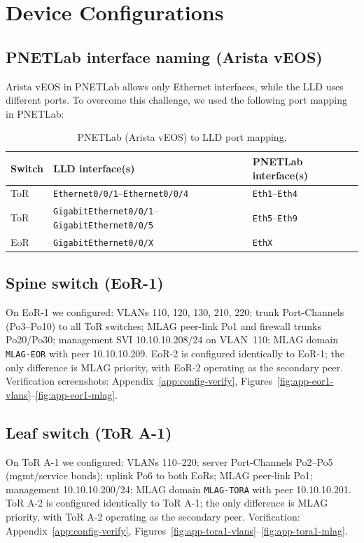 \section{Device Configurations}

\subsection{PNETLab interface naming (Arista vEOS)}
Arista vEOS in PNETLab allows only Ethernet interfaces, while the LLD uses different ports. To overcome this challenge, we used the following port mapping in PNETLab:

\begin{table}[htbp]
    \centering
    \small
    \caption{PNETLab (Arista vEOS) to LLD port mapping.}
    \label{tab:pnetlab-port-map}
    \begin{tabular}{|l|l|l|}
        \hline
        \textbf{Switch} & \textbf{LLD interface(s)} & \textbf{PNETLab interface(s)} \\
        \hline
        ToR & \texttt{Ethernet0/0/1}--\texttt{Ethernet0/0/4} & \texttt{Eth1}--\texttt{Eth4} \\
        ToR & \texttt{GigabitEthernet0/0/1}--\texttt{GigabitEthernet0/0/5} & \texttt{Eth5}--\texttt{Eth9} \\
        EoR & \texttt{GigabitEthernet0/0/X} & \texttt{EthX} \\
        \hline
    \end{tabular}
\end{table}

\subsection{Spine switch (EoR-1)}
On EoR-1 we configured: VLANs 110, 120, 130, 210, 220; trunk Port-Channels (Po3--Po10) to all ToR switches; MLAG peer-link Po1 and firewall trunks Po20/Po30; management SVI 10.10.10.208/24 on VLAN~110; MLAG domain \texttt{MLAG-EOR} with peer 10.10.10.209. EoR-2 is configured identically to EoR-1; the only difference is MLAG priority, with EoR-2 operating as the secondary peer. Verification screenshots: Appendix~\ref{app:config-verify}, Figures~\ref{fig:app-eor1-vlans}--\ref{fig:app-eor1-mlag}.

\subsection{Leaf switch (ToR A-1)}
On ToR A-1 we configured: VLANs 110--220; server Port-Channels Po2--Po5 (mgmt/service bonds); uplink Po6 to both EoRs; MLAG peer-link Po1; management 10.10.10.200/24; MLAG domain \texttt{MLAG-TORA} with peer 10.10.10.201. ToR A-2 is configured identically to ToR A-1; the only difference is MLAG priority, with ToR A-2 operating as the secondary peer. Verification: Appendix~\ref{app:config-verify}, Figures~\ref{fig:app-tora1-vlans}--\ref{fig:app-tora1-mlag}.

